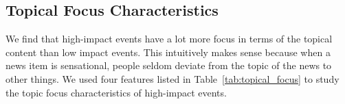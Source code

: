 \subsection{Topical Focus Characteristics}
We find that high-impact events have a lot more focus in terms of the
topical content than low impact events. This intuitively makes sense
because when a news item is sensational, people seldom deviate from
the topic of the news to other things. We used four features listed in
Table~\ref{tab:topical_focus} to study the topic focus characteristics
of high-impact events.

